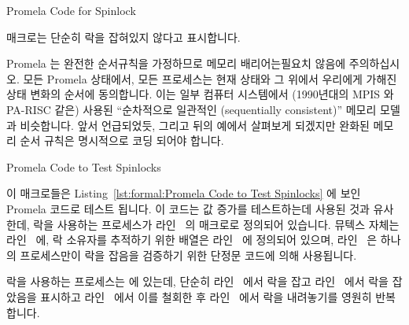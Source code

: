 \fi

\begin{listing}[tbp]

\caption{Promela Code for Spinlock}
\label{lst:formal:Promela Code for Spinlock}
\end{listing}

 매크로는 단순히 락을 잡혀있지 않다고 표시합니다.

Promela 는 완전한 순서규칙을 가정하므로 메모리 배리어는필요치 않음에
주의하십시오.
모든 Promela 상태에서, 모든 프로세스는 현재 상태와 그 위에서 우리에게 가해진
상태 변화의 순서에 동의합니다.
이는 일부 컴퓨터 시스템에서 (1990년대의 MPIS 와 PA-RISC 같은) 사용된
``순차적으로 일관적인 (sequentially consistent)'' 메모리 모델과 비슷합니다.
앞서 언급되었듯, 그리고 뒤의 예에서 살펴보게 되겠지만 완화된 메모리 순서 규칙은
명시적으로 코딩 되어야 합니다.

\iffalse

The \co{spin_unlock()} macro simply marks the lock as no
longer held.

Note that memory barriers are not needed because Promela assumes
full ordering.
In any given Promela state, all processes agree on both the current
state and the order of state changes that caused us to arrive at
the current state.
This is analogous to the ``sequentially consistent'' memory model
used by a few computer systems (such as 1990s MIPS and PA-RISC).
As noted earlier, and as will be seen in a later example,
weak memory ordering must be explicitly coded.

\fi

\begin{listing}[tb]

\caption{Promela Code to Test Spinlocks}
\label{lst:formal:Promela Code to Test Spinlocks}
\end{listing}

\begin{fcvref}
이 매크로들은
Listing~\ref{lst:formal:Promela Code to Test Spinlocks}
에 보인 Promela 코드로 테스트 됩니다.
이 코드는 값 증가를 테스트하는데 사용된 것과 유사한데, 락을 사용하는 프로세스가
라인~ 의  매크로로 정의되어 있습니다.
뮤텍스 자체는 라인~ 에, 락 소유자를 추적하기 위한 배열은
라인~ 에 정의되어 있으며, 라인~ 은 하나의 프로세스만이
락을 잡음을 검증하기 위한 단정문 코드에 의해 사용됩니다.
\end{fcvref}

\begin{fcvref}
락을 사용하는 프로세스는  에 있는데, 단순히 라인~
에서 락을 잡고 라인~ 에서 락을 잡았음을 표시하고
라인~ 에서 이를 철회한 후 라인~ 에서 락을
내려놓기를 영원히 반복합니다.
\end{fcvref}

